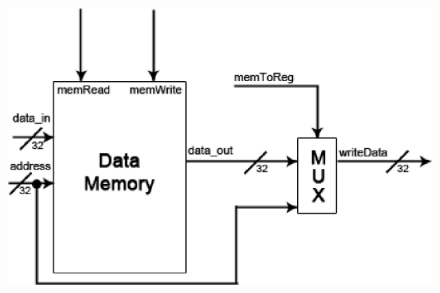 	\begin{figure}[ht]
		\begin{center}
		\includegraphics{./datapath/stages4and5.eps}
		\end{center}
	\end{figure}